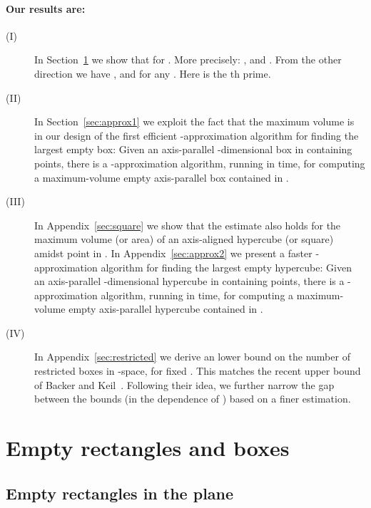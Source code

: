 \documentclass[11pt]{article}
\begin{document}
\paragraph{Our results are:}\quad
\begin{description}
\item[(I)] In Section~\ref{sec:rectangle} we show 
that  for . More precisely: 
, and
. 
From the other direction we have , and
 for any
. Here  is the th prime. 

\item[(II)] In Section~\ref{sec:approx1} we exploit the fact that
the maximum volume is  in our design
of the first efficient 
-approximation algorithm for finding the largest empty box:
Given an axis-parallel -dimensional box  in  containing
 points, there is a -approximation algorithm, running in  \linebreak
 time, 
for computing a maximum-volume empty axis-parallel box
contained in . 

\item[(III)] In Appendix~\ref{sec:square} we show that the
  estimate also holds for the maximum volume
(or area) of an axis-aligned hypercube (or square) amidst  point in . 
In Appendix~\ref{sec:approx2} we present a faster
-approximation algorithm for finding the largest empty
hypercube: Given an axis-parallel -dimensional hypercube  in  containing
 points, there is a -approximation algorithm, running in  
 time, 
for computing a maximum-volume empty axis-parallel hypercube
contained in . 

\item[(IV)] In Appendix~\ref{sec:restricted} we derive
an  lower bound on the number of restricted boxes in
-space, for fixed . This matches the recent  upper bound
of Backer and Keil~\cite{BK09a,BK09b}. Following their idea, we further
narrow the gap between the bounds (in the dependence of ) 
based on a finer estimation. 

\end{description}



\section{Empty rectangles and boxes}\label{sec:rectangle}


\subsection{Empty rectangles in the plane}\label{subsec:plane}
\end{document}

